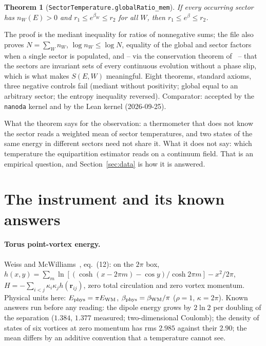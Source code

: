 \documentclass[11pt,a4paper]{article}
\newcommand{\lean}[1]{\texttt{\small #1}}
\newtheorem{theorem}{Theorem}
\begin{document}
\begin{theorem}[\lean{SectorTemperature.globalRatio\_mem}]
If every occurring sector has $n_W(E)>0$ and $r_1\le e^{\beta_W}\le r_2$ for all $W$, then
$r_1\le e^{\beta}\le r_2$.
\end{theorem}
The proof is the mediant inequality for ratios of nonnegative sums; the file also proves $N=\sum_W n_W$,
$\log n_W\le\log N$, equality of the global and sector factors when a single sector is populated, and --
via the conservation theorem of~\cite{Callens2026Causal} -- that the sectors are invariant sets of every
continuous evolution without a phase slip, which is what makes $S(E,W)$ meaningful. Eight theorems,
standard axioms, three negative controls fail (mediant without positivity; global equal to an arbitrary
sector; the entropy inequality reversed). Comparator: accepted by the \lean{nanoda} kernel and by the Lean kernel (2026-09-25).

What the theorem says for the observation: a thermometer that does not know the sector reads a weighted
mean of sector temperatures, and two states of the same energy in different sectors need not share it.
What it does not say: which temperature the equipartition estimator reads on a continuum field. That is
an empirical question, and Section~\ref{sec:data} is how it is answered.

\section{The instrument and its known answers}

\paragraph{Torus point-vortex energy.} Weiss and McWilliams~\cite{WeissMcWilliams1991}, eq.~(12): on the
$2\pi$ box, $h(x,y)=\sum_m\ln[(\cosh(x-2\pi m)-\cos y)/\cosh 2\pi m]-x^2/2\pi$,
$H=-\sum_{i<j}\kappa_i\kappa_j h(\mathbf r_{ij})$, zero total circulation and zero vortex momentum.
Physical units here: $E_{\rm phys}=\pi E_{\rm WM}$, $\beta_{\rm phys}=\beta_{\rm WM}/\pi$ ($\rho=1$,
$\kappa=2\pi$). Known answers run before any reading: the dipole energy grows by $2\ln2$ per doubling of
the separation ($1.384$, $1.377$ measured; two-dimensional Coulomb); the density of states of six vortices
at zero momentum has rms $2.985$ against their $2.90$; the mean differs by an additive convention that a
temperature cannot see.
\end{document}
